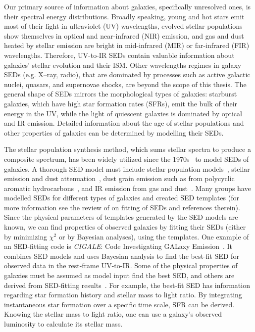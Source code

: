 Our primary source of information about galaxies, specifically unresolved ones, is their spectral energy distributions. 
Broadly speaking, young and hot stars emit most of their light in ultraviolet (UV) wavelengths, evolved stellar populations show themselves in optical and near-infrared (NIR) emission, and gas and dust heated by stellar emission are bright in mid-infrared (MIR) or far-infrared (FIR) wavelengths.
Therefore, UV-to-IR SEDs contain valuable information about galaxies' stellar evolution and their ISM. 
Other wavelengths regimes in galaxy SEDs (e.g. X--ray, radio), that are dominated by processes such as active galactic nuclei, quasars, and supernovae shocks, are beyond the scope of this thesis.
The general shape of SEDs mirrors the morphological types of galaxies: starburst galaxies, which have high star formation rates (SFRs), emit the bulk of their energy in the UV, while the light of quiescent galaxies is dominated by optical and IR emission. 
Detailed information about the age of stellar populations and other properties of galaxies can be determined by modelling their SEDs.

The stellar population synthesis method, which sums stellar spectra to produce a composite spectrum, has been widely utilized since the 1970s~\citep[e.g.][]{Tinsley72,Searle73} to model SEDs of galaxies.
A thorough SED model must include stellar population models~\citep[e.g.][]{Bruzual93,Bruzual03,Maraston05}, stellar emission and dust attenuation~\citep[e.g.][]{Calzetti00,Dopita05}, dust grain emission such as from polycyclic aromatic hydrocarbons~\citep[PAHs; e.g.][and references therein]{Tielens08}, and IR emission from gas and dust~\citep[e.g.][]{Chary01,Dale02,Lagache03,Lagache04,Smith07a,Draine07}.
Many groups have modelled SEDs for different types of galaxies and created SED templates (for more information see the review of \cite{Walcher11} on fitting of SEDs and references therein).
Since the physical parameters of templates generated by the SED models are known, we can find properties of observed galaxies by fitting their SEDs (either by minimizing $\chi^2$ or by Bayesian analyses), using the templates.
One example of an SED-fitting code is {\em CIGALE}: Code Investigating GALaxy Emission~\citep{Noll09}.
It combines SED models and uses Bayesian analysis to find the best-fit SED for observed data in the rest-frame UV-to-IR.
Some of the physical properties of galaxies must be assumed as model input find the best SED, and others are derived from SED-fitting results~\citep[see][for more detail]{Walcher08}.
For example, the best-fit SED has information regarding star formation history and stellar mass to light ratio.
By integrating instantaneous star formation over a specific time scale, SFR can be derived.
Knowing the stellar mass to light ratio, one can use a galaxy's observed luminosity to calculate its stellar mass.

